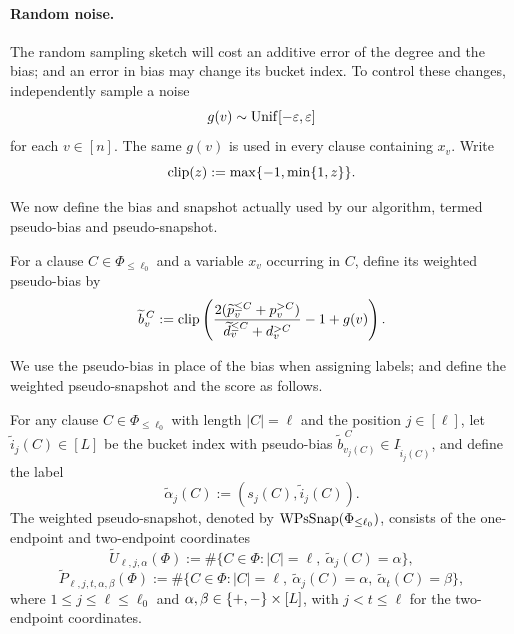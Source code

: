 \paragraph{Random noise.}     
The random sampling sketch will cost an  additive error of the degree and the bias; and 
an error in bias may change its bucket index. 
To control these changes, independently sample a noise \begin{equation}\label{eq:noise}
g(v)\sim\operatorname{Unif}[-\varepsilon,\varepsilon]   
\end{equation}
for each $v\in[n]$.
The same $g(v)$ is used in every clause containing $x_v$.
Write $$\operatorname{clip}(z):=\max\{-1,\min\{1,z\}\}.$$




\medskip
We now define the bias and snapshot actually used by our algorithm, termed pseudo-bias and pseudo-snapshot.
\begin{definition}
\label{def:weighted-pseudobias}
For a clause $C\in\Phi_{\le\ell_0}$ and a variable $x_v$ occurring in $C$, define its weighted pseudo-bias by
\[
  \widetilde b_v^{\,C}:=
  \operatorname{clip}\left(
    \frac{2(\widetilde p_v^{\le C}+p_v^{>C})}
         {\widetilde d_v^{\le C}+d_v^{>C}}
    -1+g(v)
  \right).
\]
\end{definition}

We use the pseudo-bias in place of the bias when assigning labels; and define the weighted pseudo-snapshot and the   score as follows.
\begin{definition}
\label{def:weighted-pseudosnapshot}
For any  clause $C\in\Phi_{\le\ell_0}$ with length $|C|=\ell$ and the position   $j\in[\ell ]$, let $\widetilde i_j(C)\in [L]$ be the bucket index with pseudo-bias $\widetilde b_{v_j(C)}^{\,C}\in I_{\widetilde i_j(C)}$, and define the label
\[
  \widetilde\alpha_j(C):=(s_j(C),\widetilde i_j(C)).
\]
The weighted pseudo-snapshot, denoted by $\operatorname{WPsSnap}(\Phi_{\le\ell_0})$, consists of the one-endpoint and two-endpoint coordinates
\[
  \widetilde U_{\ell,j,\alpha}(\Phi)
  :=\#\{C\in\Phi:|C|=\ell,\ \widetilde\alpha_j(C)=\alpha\},
\]
\[
  \widetilde P_{\ell,j,t,\alpha,\beta}(\Phi)
  :=\#\{C\in\Phi:|C|=\ell,\ \widetilde\alpha_j(C)=\alpha,\ \widetilde\alpha_t(C)=\beta\},
\]
where $1\le j\le\ell\le\ell_0$ and $\alpha,\beta\in\{+,-\}\times[L]$, with $j<t\le\ell$ for the two-endpoint coordinates.
\end{definition}



